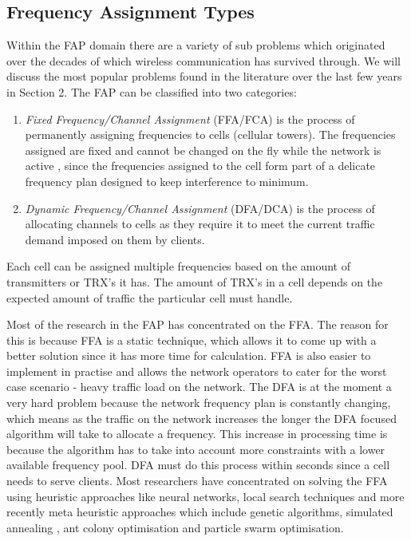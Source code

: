 \subsection{Frequency Assignment Types}
Within the FAP domain there are  a variety of sub problems which originated over the decades of which wireless communication has survived through. We will discuss the most popular problems found in the literature over the last few years in Section 2. The FAP can be classified into two categories:
\begin{enumerate}[\bf{(}a\bf{)}]
\item \emph{Fixed Frequency/Channel Assignment} (FFA/FCA) is the process of permanently assigning frequencies to cells (cellular towers). The frequencies assigned are fixed and cannot be changed on the fly while 
the network is active , since the frequencies assigned to the cell form part of a delicate frequency plan designed to keep interference to minimum.
\item \emph{Dynamic Frequency/Channel Assignment} (DFA/DCA) is the process of allocating channels to cells as they require it to meet the current traffic demand imposed on them by clients. 
\end{enumerate}
Each cell can be assigned multiple frequencies based on the amount of transmitters or TRX's it has. The amount of TRX's in a cell depends on the expected amount of traffic the particular cell must 
handle.

Most of the research in the FAP has concentrated on the FFA. The reason for this is because FFA is a static technique, which allows it to come up with a better solution since it has more time for 
calculation. FFA is also easier to implement in practise and allows the network operators to cater for the worst case scenario - heavy traffic load on the network. The DFA is at the moment a very hard 
problem because the network frequency plan is constantly changing, which means as the traffic on the network increases the longer the DFA focused algorithm will take to allocate a frequency. This 
increase in processing time is because the algorithm has to take into account more constraints with a lower available frequency pool. DFA must do this process within seconds since a cell needs to serve clients. Most researchers have concentrated on solving the FFA using heuristic approaches like neural networks, local search techniques and more recently meta heuristic approaches which include genetic algorithms, simulated annealing , ant colony optimisation and particle swarm optimisation.

